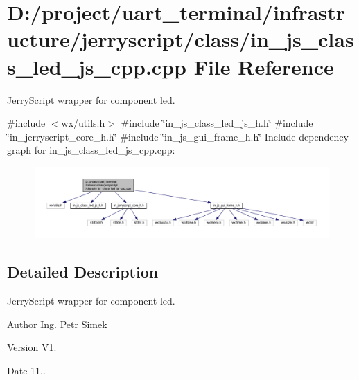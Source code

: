 \section{D\+:/project/uart\+\_\+terminal/infrastructure/jerryscript/class/in\+\_\+js\+\_\+class\+\_\+led\+\_\+js\+\_\+cpp.cpp File Reference}
\label{in__js__class__led__js__cpp_8cpp}


Jerry\+Script wrapper for component led.  


{\ttfamily \#include $<$wx/utils.\+h$>$}\newline
{\ttfamily \#include \char`\"{}in\+\_\+js\+\_\+class\+\_\+led\+\_\+js\+\_\+h.\+h\char`\"{}}\newline
{\ttfamily \#include \char`\"{}in\+\_\+jerryscript\+\_\+core\+\_\+h.\+h\char`\"{}}\newline
{\ttfamily \#include \char`\"{}in\+\_\+js\+\_\+gui\+\_\+frame\+\_\+h.\+h\char`\"{}}\newline
Include dependency graph for in\+\_\+js\+\_\+class\+\_\+led\+\_\+js\+\_\+cpp.\+cpp\+:
\nopagebreak
\begin{figure}[H]
\begin{center}
\leavevmode
\includegraphics[width=350pt]{in__js__class__led__js__cpp_8cpp__incl}
\end{center}
\end{figure}


\subsection{Detailed Description}
Jerry\+Script wrapper for component led. 

\begin{DoxyAuthor}{Author}
Ing. Petr Simek 
\end{DoxyAuthor}
\begin{DoxyVersion}{Version}
V1. 
\end{DoxyVersion}
\begin{DoxyDate}{Date}
11.. 
\end{DoxyDate}
